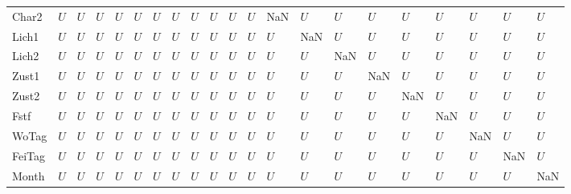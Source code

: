 \begin{tabular}{lllllllllllllllllllll}
Char2   &     $U$ &  $U$ &  $U$ &   $U$ &   $U$ &   $U$ &   $U$ &   $U$ &   $U$ &   $U$ &   $U$ &   NaN &   $U$ &   $U$ &   $U$ &   $U$ &  $U$ &   $U$ &    $U$ &   $U$ \\
Lich1   &     $U$ &  $U$ &  $U$ &   $U$ &   $U$ &   $U$ &   $U$ &   $U$ &   $U$ &   $U$ &   $U$ &   $U$ &   NaN &   $U$ &   $U$ &   $U$ &  $U$ &   $U$ &    $U$ &   $U$ \\
Lich2   &     $U$ &  $U$ &  $U$ &   $U$ &   $U$ &   $U$ &   $U$ &   $U$ &   $U$ &   $U$ &   $U$ &   $U$ &   $U$ &   NaN &   $U$ &   $U$ &  $U$ &   $U$ &    $U$ &   $U$ \\
Zust1   &     $U$ &  $U$ &  $U$ &   $U$ &   $U$ &   $U$ &   $U$ &   $U$ &   $U$ &   $U$ &   $U$ &   $U$ &   $U$ &   $U$ &   NaN &   $U$ &  $U$ &   $U$ &    $U$ &   $U$ \\
Zust2   &     $U$ &  $U$ &  $U$ &   $U$ &   $U$ &   $U$ &   $U$ &   $U$ &   $U$ &   $U$ &   $U$ &   $U$ &   $U$ &   $U$ &   $U$ &   NaN &  $U$ &   $U$ &    $U$ &   $U$ \\
Fstf    &     $U$ &  $U$ &  $U$ &   $U$ &   $U$ &   $U$ &   $U$ &   $U$ &   $U$ &   $U$ &   $U$ &   $U$ &   $U$ &   $U$ &   $U$ &   $U$ &  NaN &   $U$ &    $U$ &   $U$ \\
WoTag   &     $U$ &  $U$ &  $U$ &   $U$ &   $U$ &   $U$ &   $U$ &   $U$ &   $U$ &   $U$ &   $U$ &   $U$ &   $U$ &   $U$ &   $U$ &   $U$ &  $U$ &   NaN &    $U$ &   $U$ \\
FeiTag  &     $U$ &  $U$ &  $U$ &   $U$ &   $U$ &   $U$ &   $U$ &   $U$ &   $U$ &   $U$ &   $U$ &   $U$ &   $U$ &   $U$ &   $U$ &   $U$ &  $U$ &   $U$ &    NaN &   $U$ \\
Month   &     $U$ &  $U$ &  $U$ &   $U$ &   $U$ &   $U$ &   $U$ &   $U$ &   $U$ &   $U$ &   $U$ &   $U$ &   $U$ &   $U$ &   $U$ &   $U$ &  $U$ &   $U$ &    $U$ &   NaN \\
\bottomrule
\end{tabular}
